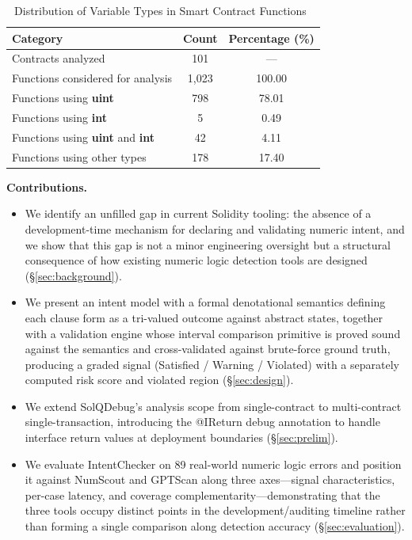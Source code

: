 \documentclass[pdflatex,sn-basic]{sn-jnl}%
\theoremstyle{thmstyleone}%
\theoremstyle{thmstyletwo}%
\theoremstyle{thmstylethree}%
\begin{document}
\begin{table}[!t]
    \centering
    \caption{Distribution of Variable Types in Smart Contract Functions~\citep{dappscananalysis}}
    \label{tab:variable_distribution}
    \small
    \begin{tabular*}{\columnwidth}{@{\extracolsep{\fill}}lcc}
        \hline
        \textbf{Category} & \textbf{Count} & \textbf{Percentage (\%)} \\
        \hline
        Contracts analyzed & 101 & --- \\
        Functions considered for analysis & 1{,}023 & 100.00 \\
        \hline
        Functions using \textbf{uint} & 798 & 78.01 \\
        Functions using \textbf{int} & 5 & 0.49 \\
        Functions using \textbf{uint} and \textbf{int} & 42 & 4.11 \\
        Functions using other types & 178 & 17.40 \\
        \hline
    \end{tabular*}
\end{table}

\smallskip
\noindent\textbf{Contributions.}
\begin{itemize}
    \item We identify an unfilled gap in current Solidity tooling: the absence of a development-time mechanism for declaring and validating numeric intent, and we show that this gap is not a minor engineering oversight but a structural consequence of how existing numeric logic detection tools are designed (§\ref{sec:background}).
    \item We present an intent model with a formal denotational semantics defining each clause form as a tri-valued outcome against abstract states, together with a validation engine whose interval comparison primitive is proved sound against the semantics and cross-validated against brute-force ground truth, producing a graded signal (Satisfied / Warning / Violated) with a separately computed risk score and violated region (§\ref{sec:design}).
    \item We extend SolQDebug's analysis scope from single-contract to multi-contract single-transaction, introducing the @IReturn debug annotation to handle interface return values at deployment boundaries (§\ref{sec:prelim}).
    \item We evaluate IntentChecker on 89 real-world numeric logic errors and position it against NumScout and GPTScan along three axes---signal characteristics, per-case latency, and coverage complementarity---demonstrating that the three tools occupy distinct points in the development/auditing timeline rather than forming a single comparison along detection accuracy (§\ref{sec:evaluation}).
\end{itemize}
\end{document}
